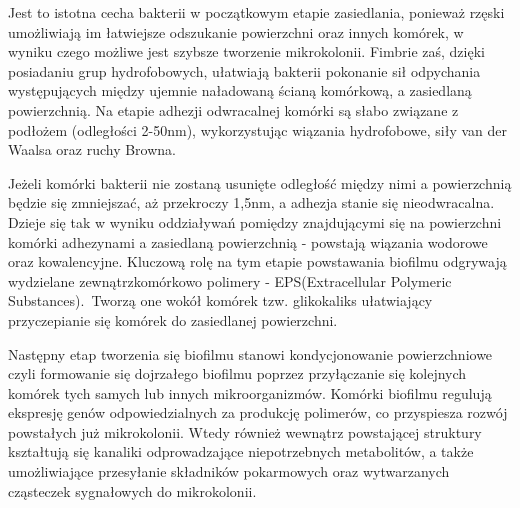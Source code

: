 \documentclass[11pt,a4paper]{report}
\begin{document}
Jest to istotna cecha bakterii w początkowym etapie zasiedlania, ponieważ rzęski umożliwiają im łatwiejsze odszukanie powierzchni oraz innych komórek, w wyniku czego możliwe jest szybsze tworzenie mikrokolonii. Fimbrie zaś, dzięki posiadaniu grup hydrofobowych, ułatwiają bakterii pokonanie sił odpychania występujących między ujemnie naładowaną ścianą komórkową, a zasiedlaną powierzchnią.
Na etapie adhezji odwracalnej komórki są słabo związane z podłożem (odległości 2-50nm), wykorzystując wiązania hydrofobowe, siły van der Waalsa oraz ruchy Browna\cite{czaczyk, kolwzan}.\

Jeżeli komórki bakterii nie zostaną usunięte odległość między nimi a powierzchnią będzie się zmniejszać, aż przekroczy 1,5nm, a adhezja stanie się nieodwracalna\cite{czaczyk, kolwzan}.
Dzieje się tak w wyniku oddziaływań pomiędzy znajdującymi się na powierzchni komórki adhezynami a zasiedlaną powierzchnią - powstają wiązania wodorowe oraz kowalencyjne\cite{myszka}.
Kluczową rolę na tym etapie powstawania biofilmu odgrywają wydzielane zewnątrzkomórkowo polimery - EPS(Extracellular Polymeric Substances).\ 
Tworzą one wokół komórek tzw. glikokaliks ułatwiający przyczepianie się komórek do zasiedlanej powierzchni\cite{shi}.\


Następny etap tworzenia się biofilmu stanowi kondycjonowanie powierzchniowe czyli formowanie się dojrzałego biofilmu poprzez przyłączanie się kolejnych komórek tych samych lub innych mikroorganizmów. Komórki biofilmu regulują ekspresję genów odpowiedzialnych za produkcję polimerów, co przyspiesza rozwój powstałych już mikrokolonii. Wtedy również wewnątrz powstającej struktury kształtują się kanaliki odprowadzające niepotrzebnych metabolitów, a także umożliwiające przesyłanie składników pokarmowych oraz wytwarzanych cząsteczek sygnałowych do mikrokolonii\cite{Lawless, Stankowska, czaczyk-myszka}.\


\end{document}

